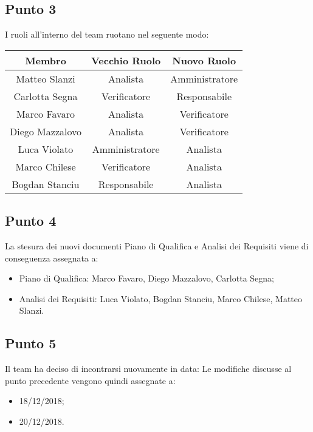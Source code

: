 \subsection{Punto 3}
I ruoli all'interno del team ruotano nel seguente modo:\\
\begin{center}
\begin{tabular}{|c|c|c|}
\hline
\textbf{Membro} & \textbf{Vecchio Ruolo} & \textbf{Nuovo Ruolo}\\
\hline
Matteo Slanzi & Analista & Amministratore\\
\hline
Carlotta Segna & Verificatore & Responsabile\\
\hline
Marco Favaro & Analista & Verificatore\\
\hline
Diego Mazzalovo & Analista & Verificatore\\
\hline
Luca Violato & Amministratore & Analista\\
\hline
Marco Chilese & Verificatore & Analista\\
\hline
Bogdan Stanciu & Responsabile & Analista\\
\hline
\end{tabular}
\end{center}

\subsection{Punto 4}
La stesura dei nuovi documenti Piano di Qualifica e Analisi dei Requisiti viene di conseguenza assegnata a:
\begin{itemize}
	\item Piano di Qualifica: Marco Favaro, Diego Mazzalovo, Carlotta Segna;
	\item Analisi dei Requisiti: Luca Violato, Bogdan Stanciu, Marco Chilese, Matteo Slanzi.
\end{itemize}

\subsection{Punto 5}
Il team ha deciso di incontrarsi nuovamente in data:
Le modifiche discusse al punto precedente vengono quindi assegnate a:
\begin{itemize}
	\item 18/12/2018;
	\item 20/12/2018.
\end{itemize}